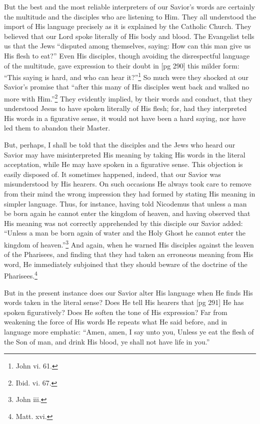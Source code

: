 But the best and the most reliable interpreters
of our Savior's words are certainly the multitude
and the disciples who are listening to Him. They
all understood the import of His language precisely
as it is explained by the Catholic Church. They
believed that our Lord spoke literally of His body
and blood. The Evangelist tells us that the Jews
“disputed among themselves, saying: How can
this man give us His flesh to eat?” Even His disciples,
though avoiding the disrespectful language
of the multitude, gave expression to their doubt in
[pg 290]
this milder form: “This saying is hard, and who
can hear it?”\footnote{John vi.
61.} So much were they shocked at our
Savior's promise that “after this many of His disciples
went back and walked no more with Him.”\footnote{Ibid. vi. 67.}
They evidently implied, by their words and conduct,
that they understood Jesus to have spoken
literally of His flesh; for, had they interpreted His
words in a figurative sense, it would not have been
a hard saying, nor have led them to abandon their
Master.

But, perhaps, I shall be told that the disciples
and the Jews who heard our Savior may have misinterpreted
His meaning by taking His words in
the literal acceptation, while He may have spoken
in a figurative sense. This objection is easily disposed
of. It sometimes happened, indeed, that
our Savior was misunderstood by His hearers. On
such occasions He always took care to remove
from their mind the wrong impression they had
formed by stating His meaning in simpler language.
Thus, for instance, having told Nicodemus
that unless a man be born again he cannot
enter the kingdom of heaven, and having observed
that His meaning was not correctly apprehended
by this disciple our Savior added: “Unless a man
be born again of water and the Holy Ghost he cannot
enter the kingdom of heaven.”\footnote{John iii.} And again,
when he warned His disciples against the leaven
of the Pharisees, and finding that they had taken
an erroneous meaning from His word, He immediately
subjoined that they should beware of the
doctrine of the Pharisees.\footnote{Matt. xvi.}

But in the present instance does our Savior alter
His language when He finds His words taken in
the literal sense? Does He tell His hearers that
[pg 291]
He has spoken figuratively? Does He soften the
tone of His expression? Far from weakening the
force of His words He repeats what He said before,
and in language more emphatic: “Amen,
amen, I say unto you, Unless ye eat the flesh of
the Son of man, and drink His blood, ye shall not
have life in you.”

